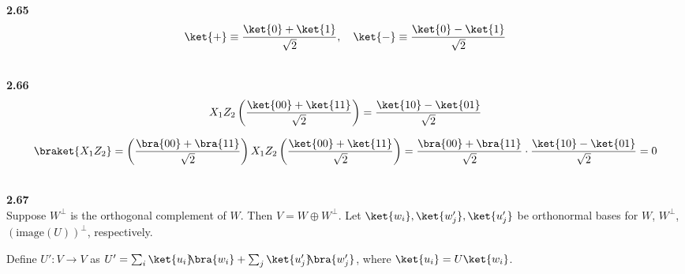 \documentclass[10pt]{book}
\newcommand{\kbt}[2]{\ket{#1}\hspace{-1mm} \bra{#2}} %
\newcommand{\Textbf}[1]{\hspace{3mm}\\ \textbf{#1}\\}
\begin{document}
	
	\Textbf{2.65}
	\begin{equation}
\begin{aligned}
		\ket{+} \equiv \frac{\ket{0} + \ket{1}}{\sqrt{2}}, ~~~ \ket{-} \equiv \frac{\ket{0} - \ket{1}}{\sqrt{2}}
	\end{aligned}
\end{equation}
	
	
	\Textbf{2.66}
	\begin{equation}
\begin{aligned}
		X_1 Z_2 \left(\frac{\ket{00} + \ket{11}}{\sqrt{2}} \right) = \frac{\ket{10} - \ket{01}}{\sqrt{2}}
	\end{aligned}
\end{equation}
	
	
	\begin{equation}
\begin{aligned}
		\braket{X_1 Z_2} = \left(\frac{\bra{00} + \bra{11}}{\sqrt{2}} \right) X_1 Z_2 \left(\frac{\ket{00} + \ket{11}}{\sqrt{2}} \right)
		= \frac{\bra{00} + \bra{11}}{\sqrt{2}}  \cdot \frac{\ket{10} - \ket{01}}{\sqrt{2}}
		= 0
	\end{aligned}
\end{equation}
	
	
	
	\Textbf{2.67}
	
	Suppose $W^\perp$ is the orthogonal complement of $W$. Then $V = W \oplus W^\perp$.
	Let $\ket{w_i},\ket{w_j'},\ket{u_j'}$ be orthonormal bases for $W$, $W^\perp$, $\left( \mathrm{image}(U) \right)^\perp$, respectively.
	
	Define $U': V \rightarrow V$ as $U' = \sum_i \kbt{u_i}{w_i} + \sum_j \kbt{u_j'}{w_j'}$,
	where $\ket{u_i} = U \ket{w_i}$.
	
\end{document}
